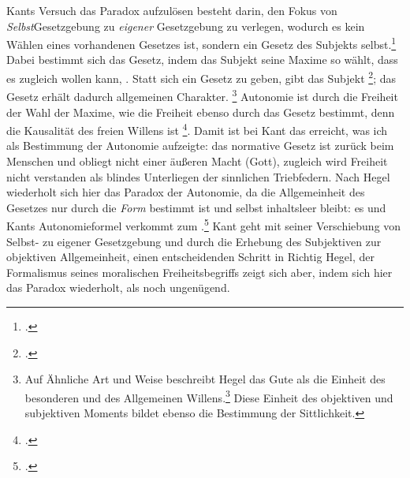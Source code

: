 \documentclass[12pt, a4paper, openany]{report}
\begin{document}
Kants Versuch das Paradox aufzulösen besteht darin, den Fokus von \emph{Selbst}\-Gesetzgebung zu \emph{eigener} Gesetzgebung zu verlegen, wodurch es kein Wählen eines vorhandenen Gesetzes ist, sondern ein Gesetz des Subjekts selbst.\footcite[Vgl.][22]{menke_autonomie_2018}
Dabei bestimmt sich das Gesetz, indem das Subjekt seine Maxime so wählt, dass es zugleich wollen kann, . 
Statt sich ein Gesetz zu geben, gibt das Subjekt \footcite[][24]{menke_autonomie_2018}; das Gesetz erhält dadurch allgemeinen Charakter.%
\footnote{
    \cite[Vgl.][65.]{kant_kritik_2014} 
    Auf Ähnliche Art und Weise beschreibt Hegel das Gute als die Einheit des besonderen und des Allgemeinen Willens.\footcite[Vgl.][§ 129, S. 134.]{hegel_grundlinien_2017}
    Diese Einheit des objektiven und subjektiven Moments bildet ebenso die Bestimmung der Sittlichkeit.
}
Autonomie ist durch die Freiheit der Wahl der Maxime, wie die Freiheit ebenso durch das Gesetz bestimmt, denn die Kausalität des freien Willens ist \footcite[][81]{kant_kritik_2014}.
Damit ist bei Kant das erreicht, was ich als Bestimmung der Autonomie aufzeigte: 
das normative Gesetz ist zurück beim Menschen und obliegt nicht einer äußeren Macht (Gott), zugleich wird Freiheit nicht verstanden als blindes Unterliegen der sinnlichen Triebfedern. 
Nach Hegel wiederholt sich hier das Paradox der Autonomie, da die Allgemeinheit des Gesetzes nur durch die \emph{Form} bestimmt ist und selbst inhaltsleer bleibt:
es  und Kants Autonomieformel verkommt zum .\footcite[][§ 135, S. 139.]{hegel_grundlinien_2017}
Kant geht mit seiner Verschiebung von Selbst- zu eigener Gesetzgebung und durch die Erhebung des Subjektiven zur objektiven Allgemeinheit, einen entscheidenden Schritt in Richtig Hegel, der Formalismus seines moralischen Freiheitsbegriffs zeigt sich aber, indem sich hier das Paradox wiederholt, als noch ungenügend.\\
\end{document}
